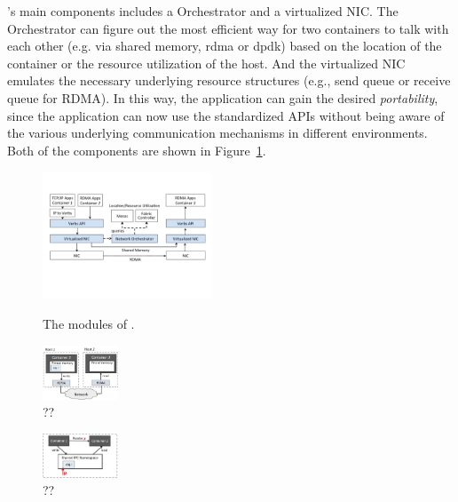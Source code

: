 \sysname's main components includes a Orchestrator and a virtualized NIC.
The Orchestrator can figure out the most efficient way for two containers to talk with each other (e.g. 
via shared memory, rdma or dpdk) based on the location of the container or the resource
utilization of the host.
And the virtualized NIC emulates the necessary underlying resource structures 
(e.g., send queue or receive queue for RDMA). In this way, the application can
gain the desired \emph{portability}, since the application can now use the standardized  
APIs without being aware of the various underlying communication
mechanisms in different environments. 
Both of the components are shown in Figure~\ref{fig:system_modules}.

     \begin{figure}[ht]
     \centering 
     \includegraphics[width=0.45\textwidth]{figures/system/system_modules.pdf}      
     \label{fig:system_modules}
     \caption{The modules of \sysname.} 
     \end{figure}
     
      \begin{figure}[ht]
         \centering 
         \includegraphics[width=0.2\textwidth]{figures/rdma-container.png}   
         \caption{??}   
      \end{figure}
      
      \begin{figure}[ht]
      	\centering 
      	\includegraphics[width=0.2\textwidth]{figures/shared-mem-container.png}   
      	\caption{??}   
      \end{figure}

